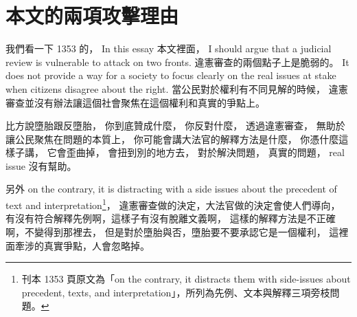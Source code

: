 \section{本文的兩項攻擊理由}

\hypertarget{w06:cue:314}{}我們看一下 1353 的，
\hypertarget{w06:cue:315}{}In this essay 本文裡面，
\hypertarget{w06:cue:316}{}I should argue that a judicial review is vulnerable to attack on two fronts.
\hypertarget{w06:cue:317}{}違憲審查的兩個點子上是脆弱的。
\hypertarget{w06:cue:318}{}It does not provide a way for a society to focus clearly on the real issues at stake when citizens disagree about the right.
\hypertarget{w06:cue:319}{}當公民對於權利有不同見解的時候，
\hypertarget{w06:cue:320}{}違憲審查並沒有辦法讓這個社會聚焦在這個權利和真實的爭點上。

\hypertarget{w06:cue:321}{}比方說墮胎跟反墮胎，
\hypertarget{w06:cue:322}{}你到底贊成什麼，
\hypertarget{w06:cue:323}{}你反對什麼，
\hypertarget{w06:cue:324}{}透過違憲審查，
\hypertarget{w06:cue:325}{}無助於讓公民聚焦在問題的本質上，
\hypertarget{w06:cue:326}{}你可能會講大法官的解釋方法是什麼，
\hypertarget{w06:cue:327}{}你憑什麼這樣子講，
\hypertarget{w06:cue:328}{}它會歪曲掉，
\hypertarget{w06:cue:329}{}會扭到別的地方去，
\hypertarget{w06:cue:330}{}對於解決問題，
\hypertarget{w06:cue:331}{}真實的問題，
\hypertarget{w06:cue:332}{}real issue 沒有幫助。

\hypertarget{w06:cue:333}{}另外 on the contrary, it is distracting with a side issues about the precedent of text and interpretation\footnote{刊本 1353 頁原文為「on the contrary, it distracts them with side-issues about precedent, texts, and interpretation」，所列為先例、文本與解釋三項旁枝問題。}，
\hypertarget{w06:cue:334}{}違憲審查做的決定，大法官做的決定會使人們導向，
\hypertarget{w06:cue:335}{}有沒有符合解釋先例啊，這樣子有沒有脫離文義啊，
\hypertarget{w06:cue:336}{}這樣的解釋方法是不正確啊，不變得到那裡去，
\hypertarget{w06:cue:337}{}但是對於墮胎與否，墮胎要不要承認它是一個權利，
\hypertarget{w06:cue:338}{}這裡面牽涉的真實爭點，人會忽略掉。

